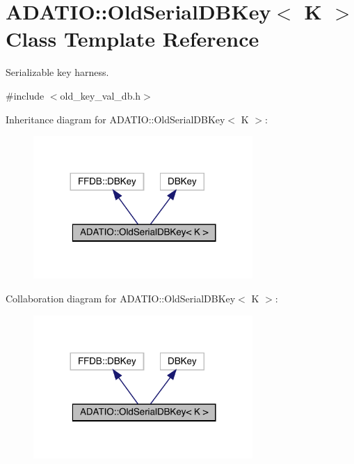 \hypertarget{classADATIO_1_1OldSerialDBKey}{}\section{A\+D\+A\+T\+IO\+:\+:Old\+Serial\+D\+B\+Key$<$ K $>$ Class Template Reference}
\label{classADATIO_1_1OldSerialDBKey}


Serializable key harness.  




{\ttfamily \#include $<$old\+\_\+key\+\_\+val\+\_\+db.\+h$>$}



Inheritance diagram for A\+D\+A\+T\+IO\+:\+:Old\+Serial\+D\+B\+Key$<$ K $>$\+:\nopagebreak
\begin{figure}[H]
\begin{center}
\leavevmode
\includegraphics[width=236pt]{da/d95/classADATIO_1_1OldSerialDBKey__inherit__graph}
\end{center}
\end{figure}


Collaboration diagram for A\+D\+A\+T\+IO\+:\+:Old\+Serial\+D\+B\+Key$<$ K $>$\+:\nopagebreak
\begin{figure}[H]
\begin{center}
\leavevmode
\includegraphics[width=236pt]{df/dcd/classADATIO_1_1OldSerialDBKey__coll__graph}
\end{center}
\end{figure}
